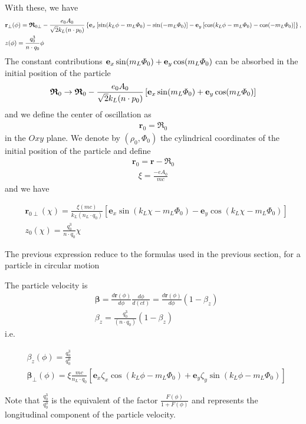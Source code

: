 With these, we have
\begin{align}
  & {\bf r}_{\perp}(\phi)
  = {\boldsymbol{\mathfrak R}}_{0\perp}
  -\frac{e_0 A_0}{\sqrt{2}k_L(n\cdot p_0)}
  \left\{
    {\bf e}_x\left[\sin(k_L\phi-m_L\varPhi_0)-\sin(-m_L\varPhi_0)\right]-{\bf e}_y\left[\cos(k_L\phi-m_L\varPhi_0)-\cos(-m_L\varPhi_0)\right]
  \right\},\nonumber       \\
  & z(\phi)=\frac{q_0^3}{n\cdot q_0}\phi
\end{align}
The constant contributions ${\bf e}_x\sin(m_L\varPhi_0)+{\bf e}_y\cos(m_L\varPhi_0)$ can be absorbed in the initial position of the particle
\begin{align}
  {\boldsymbol{\mathfrak{R}}}_0\rightarrow{\boldsymbol{\mathfrak{R}}}_0-\frac{e_0 A_0}{\sqrt{2}k_L(n\cdot p_0)}\left[{\bf e}_x\sin(m_L\varPhi_0)+{\bf e}_y\cos(m_L\varPhi_0)\right]
\end{align}
and we define the center of oscillation as
\begin{align}
  {\bm r}_0 = {\boldsymbol{\mathfrak R}}_0
\end{align}
in the $Oxy$ plane. We denote by $(\rho_0, \varPhi_0)$ the cylindrical coordinates of the initial position of the particle and define
\begin{align}
  {\bm r}_0={\bm r}-{\boldsymbol{\mathfrak{R}}_0}
\end{align}
\begin{align}
  \xi = \frac{-e A_0}{mc}
\end{align}
and we have
\begin{importantbox}
  \begin{align}
    & {\bm r}_{0\perp}(\chi)=\frac{\xi (mc)}{k_L(n_L\cdot q_0)}\left[{\bm e}_x\sin(k_L\chi-m_L\varPhi_0)-{\bm e}_y\cos(k_L\chi-m_L\varPhi_0)\right]                                                  \\
    & z_0(\chi)=\frac{q_0^3}{n\cdot q_0}\chi
  \end{align}
\end{importantbox}
\begin{warningbox}{}
  The previous expression reduce to the formulas used in the previous section, for a particle in circular motion
\end{warningbox}
The particle velocity is
\begin{align}
  & {\boldsymbol\beta}=\frac{d{\bm r}(\phi)}{d\phi}\frac{d\phi}{d (ct)}=\frac{d{\bm r}(\phi)}{d\phi}(1-\beta_z) \\
  & \beta_z =\frac{q_0^3}{(n\cdot q_0)}(1-\beta_z)
\end{align}
i.e.
\begin{importantbox}
  \begin{align}
    & \beta_z(\phi) =\frac{q_0^3}{q_0^0} \\
    & {\boldsymbol{\beta}}_\perp(\phi)=\xi\frac{mc}{n_L\cdot q_0}\left[{\bm e}_x\zeta_x\cos(k_L\phi-m_L\varPhi_0)+{\bm e}_y\zeta_y\sin(k_L\phi-m_L\varPhi_0)\right]
  \end{align}
\end{importantbox}

\begin{warningbox}{}
  Note that $\frac{q_0^3}{q_0^0}$ is the equivalent of the factor $\frac{F(\phi)}{1+F(\phi)}$ and represents the longitudinal component of the particle velocity.
\end{warningbox}
